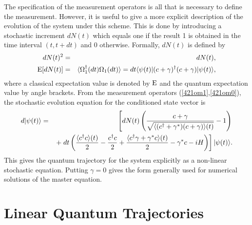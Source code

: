 The specification of the measurement operators is all that is necessary to
define the measurement. However, it is useful to give a more explicit
description of the evolution of the system under this scheme. This is done by
introducing a stochastic increment $dN(t)$ which equals one if the result 1 is
obtained in the time interval $(t,t+dt)$ and 0 otherwise. Formally, $dN(t)$ is
defined by
\begin{eqnarray}
dN(t)^2 &=& dN(t) ,\\
	{\rm E}[dN(t)]&=&\langle \Omega_1^\dagger(dt)\Omega_1(dt) \rangle = dt \langle {\psi(t)} |
(c+\gamma)^\dagger (c+\gamma) | {\psi(t)} \rangle,
\end{eqnarray}
where a classical expectation value is denoted by ${\rm E}$ and the quantum
expectation value by angle brackets. 
From the measurement operators (\ref{421om1},\ref{421om0}), 
the stochastic evolution equation for the conditioned state vector is
\begin{eqnarray} 
d|\psi (t) \rangle  &=& \left[ dN(t)\left( \frac{c+\gamma}
{\sqrt{\langle (c^\dagger+\gamma^*)(c+\gamma)\rangle(t)}} - 1 \right)\right. \nonumber \\
&& \left. + \; dt \left( \frac{\langle 
c^\dagger c \rangle(t)}{2} - \frac{c^\dagger c}{2} + 
\frac{\langle c^\dagger \gamma + \gamma^* c \rangle(t)}{2} 
- \gamma^* c -{i}H \right) \right] |\psi(t) \rangle. \label{412sse1b}
\end{eqnarray}
 This gives the quantum trajectory for the system explicitly as a non-linear
stochastic \sch equation. Putting $\gamma=0$ gives the form generally used for
numerical solutions of the master equation.

\section{Linear Quantum Trajectories}

